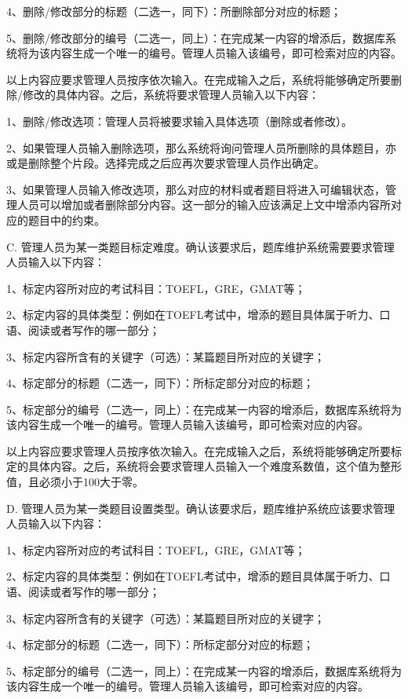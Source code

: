 4、删除/修改部分的标题（二选一，同下）：所删除部分对应的标题；

5、删除/修改部分的编号（二选一，同上）：在完成某一内容的增添后，数据库系统将为该内容生成一个唯一的编号。管理人员输入该编号，即可检索对应的内容。

以上内容应要求管理人员按序依次输入。在完成输入之后，系统将能够确定所要删除/修改的具体内容。之后，系统将要求管理人员输入以下内容：

1、删除/修改选项：管理人员将被要求输入具体选项（删除或者修改）。

2、如果管理人员输入删除选项，那么系统将询问管理人员所删除的具体题目，亦或是删除整个片段。选择完成之后应再次要求管理人员作出确定。

3、如果管理人员输入修改选项，那么对应的材料或者题目将进入可编辑状态，管理人员可以增加或者删除部分内容。这一部分的输入应该满足上文中增添内容所对应的题目中的约束。

C. 管理人员为某一类题目标定难度。确认该要求后，题库维护系统需要要求管理人员输入以下内容：

1、标定内容所对应的考试科目：TOEFL，GRE，GMAT等；

2、标定内容的具体类型：例如在TOEFL考试中，增添的题目具体属于听力、口语、阅读或者写作的哪一部分；

3、标定内容所含有的关键字（可选）：某篇题目所对应的关键字；

4、标定部分的标题（二选一，同下）：所标定部分对应的标题；

5、标定部分的编号（二选一，同上）：在完成某一内容的增添后，数据库系统将为该内容生成一个唯一的编号。管理人员输入该编号，即可检索对应的内容。

以上内容应要求管理人员按序依次输入。在完成输入之后，系统将能够确定所要标定的具体内容。之后，系统将会要求管理人员输入一个难度系数值，这个值为整形值，且必须小于100大于零。

D. 管理人员为某一类题目设置类型。确认该要求后，题库维护系统应该要求管理人员输入以下内容：

1、标定内容所对应的考试科目：TOEFL，GRE，GMAT等；

2、标定内容的具体类型：例如在TOEFL考试中，增添的题目具体属于听力、口语、阅读或者写作的哪一部分；

3、标定内容所含有的关键字（可选）：某篇题目所对应的关键字；

4、标定部分的标题（二选一，同下）：所标定部分对应的标题；

5、标定部分的编号（二选一，同上）：在完成某一内容的增添后，数据库系统将为该内容生成一个唯一的编号。管理人员输入该编号，即可检索对应的内容。

